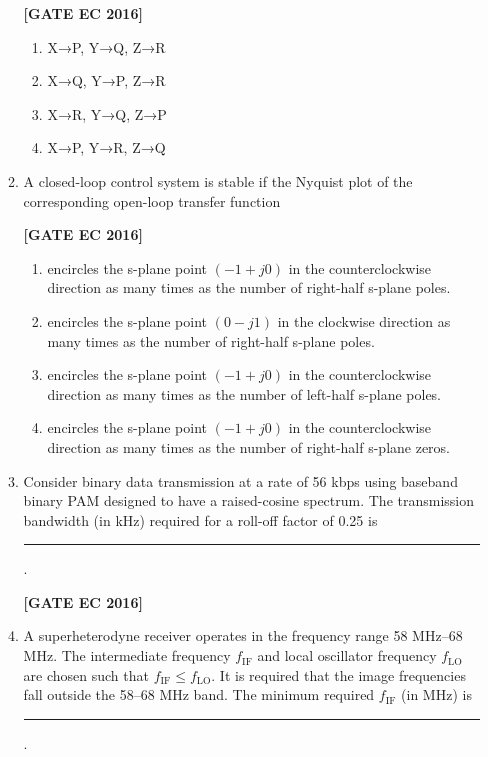 \documentclass[12pt]{article}
\begin{document}
\begin{enumerate}[label=\textbf{Q.\arabic*.}, start=6, itemsep=2em]
\begin{enumerate}[label=\textbf{Q.\arabic*.}]
\noindent \textbf{[GATE EC 2016]}

\begin{multicols}{2}
\begin{enumerate}[label=\alph*.]
    \item X→P, Y→Q, Z→R
    \item X→Q, Y→P, Z→R
    \item X→R, Y→Q, Z→P
    \item X→P, Y→R, Z→Q
\end{enumerate}
\end{multicols}

\item A closed-loop control system is stable if the Nyquist plot of the corresponding open-loop transfer function

\noindent \textbf{[GATE EC 2016]}

\begin{multicols}{2}
\begin{enumerate}[label=\alph*.]
    \item encircles the s-plane point $(-1+j0)$ in the counterclockwise direction as many times as the number of right-half s-plane poles.
    \item encircles the s-plane point $(0-j1)$ in the clockwise direction as many times as the number of right-half s-plane poles.
    \item encircles the s-plane point $(-1+j0)$ in the counterclockwise direction as many times as the number of left-half s-plane poles.
    \item encircles the s-plane point $(-1+j0)$ in the counterclockwise direction as many times as the number of right-half s-plane zeros.
\end{enumerate}
\end{multicols}

\item Consider binary data transmission at a rate of 56 kbps using baseband binary PAM designed to have a raised-cosine spectrum. The transmission bandwidth (in kHz) required for a roll-off factor of 0.25 is \rule{2.5cm}{0.4pt}.

\noindent \textbf{[GATE EC 2016]}

\item A superheterodyne receiver operates in the frequency range 58 MHz–68 MHz. The intermediate frequency $f_{\text{IF}}$ and local oscillator frequency $f_{\text{LO}}$ are chosen such that $f_{\text{IF}}\le f_{\text{LO}}$. It is required that the image frequencies fall outside the 58–68 MHz band. The minimum required $f_{\text{IF}}$ (in MHz) is \rule{2.5cm}{0.4pt}.


\end{enumerate}
\end{enumerate}
\end{document}
